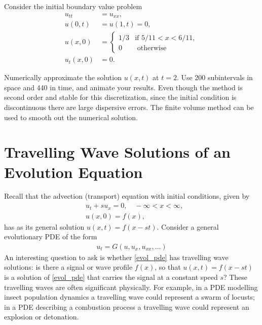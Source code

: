 \begin{problem}
Consider the initial boundary value problem 
\begin{align*}
	u_{tt} &= u_{xx}, \\
	u(0,t) &= u(1,t) = 0, \\
	u(x,0) &= \begin{cases} 1/3 & \text{if } 5/11 < x < 6/11,\\
	0 & \text{ otherwise}
	\end{cases}\\ 
	u_t(x,0) &= 0.
\end{align*}

Numerically approximate the solution $u(x,t)$ at $t = 2$.
Use 200 subintervals in space and 440 in time, and animate your results.
Even though the method is second order and stable for this discretization, since the initial condition is discontinuous there are large dispersive errors.
The finite volume method can be used to smooth out the numerical solution.
\end{problem}

\section*{Travelling Wave Solutions of an Evolution Equation}
Recall that the advection (transport) equation with initial conditions, given by
\begin{align*}
	&{ }u_t + su_x  = 0, \quad -\infty < x < \infty, \\
	&{ }u(x,0) = f(x),
\end{align*}
has as its general solution $u(x,t) = f(x -st)$.
Consider a general evolutionary PDE of the form
\begin{align}
u_t = G(u,u_x, u_{xx}, \ldots)
\label{evol_pde}
\end{align}
An interesting question to ask is whether \eqref{evol_pde} has travelling wave solutions: is there a signal or wave profile $f(x)$, so that $u(x,t) = f(x-st)$ is a solution of \eqref{evol_pde} that carries the signal at a constant speed $s$?
These travelling waves are often significant physically.
For example, in a PDE modelling insect population dynamics a travelling wave could represent a swarm of locusts; in a PDE describing a combustion process a travelling wave could represent an explosion or detonation. 


